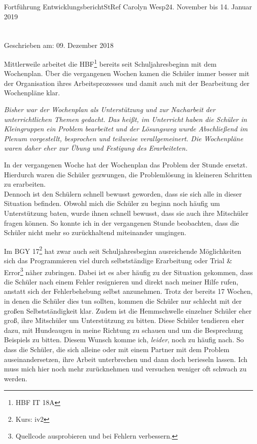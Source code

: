 \documentclass[oneside,openany,headings=optiontotoc,11pt,numbers=noenddot]{article}
\begin{document}
\begin{worksheet}{Fortführung Entwicklungsbericht}{StRef\grq{} Carolyn Wesp}{24. November bis 14. Januar 2019}
		\section*{}
		\tiny{Geschrieben am: 09. Dezember 2018}\small\\
		\par\noindent
		\color{ma}
		Mittlerweile arbeitet die HBF\footnote{HBF IT 18A} bereits seit Schuljahresbeginn mit dem Wochenplan. Über die vergangenen Wochen kamen die Schüler immer besser mit der Organisation ihres Arbeitsprozesses und damit auch mit der Bearbeitung der Wochenpläne klar.
		\par
		\setlength{\leftskip}{1cm}
		\noindent
		\textit{Bisher war der Wochenplan als Unterstützung und zur Nacharbeit der unterrichtlichen Themen gedacht. Das heißt, im Unterricht haben die Schüler in Kleingruppen ein Problem bearbeitet und der Lösungsweg wurde Abschließend im Plenum vorgestellt, besprochen und teilweise verallgemeinert. Die Wochenpläne waren daher eher zur Übung und Festigung des Erarbeiteten.}
		\par
		\setlength{\leftskip}{0cm}
		\noindent
		In der vergangenen Woche hat der Wochenplan das Problem der Stunde ersetzt. Hierdurch waren die Schüler gezwungen, die Problemlösung in kleineren Schritten zu erarbeiten.\\
		Dennoch ist den Schülern schnell bewusst geworden, dass sie sich alle in dieser Situation befinden. Obwohl mich die Schüler zu beginn noch häufig um Unterstützung baten, wurde ihnen schnell bewusst, dass sie auch ihre Mitschüler fragen können. So konnte ich in der vergangenen Stunde beobachten, dass die Schüler nicht mehr so zurückhaltend miteinander umgingen.\\
		\par\noindent
		\color{iv}
		Im BGY 17\footnote{Kurs: iv2} hat zwar auch seit Schuljahresbeginn ausreichende Möglichkeiten sich das Programmieren viel durch selbstständige Erarbeitung oder Trial \& Error\footnote{Quellcode ausprobieren und bei Fehlern verbessern.} näher zubringen. Dabei ist es aber häufig zu der Situation gekommen, dass die Schüler nach einem Fehler resignieren und direkt nach meiner Hilfe rufen, anstatt sich der Fehlerbehebung selbst anzunehmen. Trotz der bereits 17 Wochen, in denen die Schüler dies tun sollten, kommen die Schüler nur schlecht mit der großen Selbstständigkeit klar. Zudem ist die Hemmschwelle einzelner Schüler eher groß, ihre Mitschüler um Unterstützung zu bitten. Diese Schüler tendieren eher dazu, mit Hundeaugen in meine Richtung zu schauen und um die Besprechung Beispiels zu bitten. Diesem Wunsch komme ich, \textit{leider}, noch zu häufig nach. So dass die Schüler, die sich alleine oder mit einem Partner mit dem Problem auseinandersetzen, ihre Arbeit unterbrechen und dann doch berieseln lassen. Ich muss mich hier noch mehr zurücknehmen und versuchen weniger oft schwach zu werden.\\

\end{worksheet}
\end{document}
